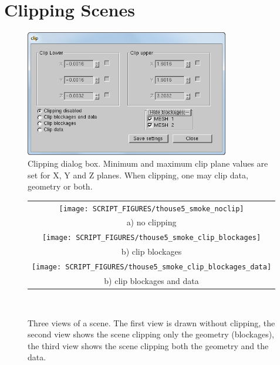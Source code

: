 \documentclass[11pt,twoside]{book}
\begin{document}
\section{Clipping Scenes}
\label{section:clipping}

\begin{figure}[bph]
\begin{center}
\includegraphics[width=3.506944in]{FIGURES/figCLIP}
\end{center}
\caption[Clipping dialog box.]{Clipping dialog box.
Minimum and maximum clip plane values are set for X, Y and Z planes.
When clipping, one may clip data, geometry or both. }
\label{figCLIP}
\end{figure}

\begin{figure}[bph]
\begin{center}
\begin{tabular}{c}
\texttt{[image: SCRIPT\_FIGURES/thouse5\_smoke\_noclip]}\\
a) no clipping\\
\texttt{[image: SCRIPT\_FIGURES/thouse5\_smoke\_clip\_blockages]}\\
b) clip blockages\\
\texttt{[image: SCRIPT\_FIGURES/thouse5\_smoke\_clip\_blockages\_data]}\\
b) clip blockages and data\\
\end{tabular}
\end{center}
\caption[Clipping a scene.]{Three views of a scene. The first view
is drawn without clipping, the second view shows the scene
clipping only the geometry (blockages), the third view shows the
scene clipping both the geometry and the data.}\ \label{figCLIPPED}
\end{figure}
\end{document}
